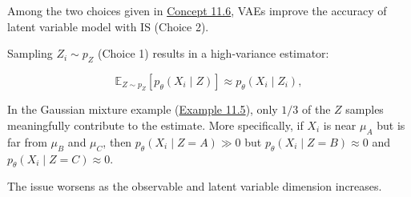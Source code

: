 \begin{concept}
    Among the two choices given in \hyperref[concept:11.6]{Concept 11.6}, VAEs improve the accuracy of latent variable model with IS (Choice 2).

    Sampling $Z_{i} \sim p_{Z}$ (Choice 1) results in a high-variance estimator:

    $$
    \mathbb{E}_{Z \sim p_{Z}}\left[p_{\theta}\left(X_{i} \mid Z\right)\right] \approx p_{\theta}\left(X_{i} \mid Z_{i}\right),
    $$

    In the Gaussian mixture example (\hyperref[example:11.5]{Example 11.5}), only $1 / 3$ of the $Z$ samples meaningfully contribute to the estimate. More specifically, if $X_{i}$ is near $\mu_{A}$ but is far from $\mu_{B}$ and $\mu_{C}$, then $p_{\theta}\left(X_{i} \mid Z=A\right) \gg 0$ but $p_{\theta}\left(X_{i} \mid Z=B\right) \approx 0$ and $p_{\theta}\left(X_{i} \mid Z=C\right) \approx 0$.

    The issue worsens as the observable and latent variable dimension increases.
\end{concept}

\par\noindent\textcolor{gray}{\hdashrule{\textwidth}{0.4pt}{1pt 2pt}}

